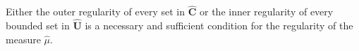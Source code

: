 Either the outer regularity of every set in $\hat{\mathbf{C}}$ or the inner regularity of every bounded set in $\hat{\mathbf{U}}$ is a necessary and sufficient condition for the regularity of the measure $\hat{\mu}$.
